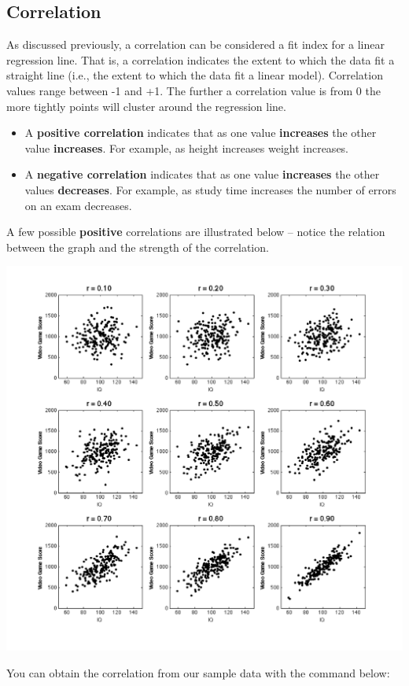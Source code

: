\documentclass[
]{krantz}
\begin{document}
\hypertarget{correlation-2}{%
\subsection{Correlation}\label{correlation-2}}

As discussed previously, a correlation can be considered a fit index for a linear regression line. That is, a correlation indicates the extent to which the data fit a straight line (i.e., the extent to which the data fit a linear model). Correlation values range between -1 and +1. The further a correlation value is from 0 the more tightly points will cluster around the regression line.

\begin{itemize}
\item
  A \textbf{positive correlation} indicates that as one value \textbf{increases} the other value \textbf{increases}. For example, as height increases weight increases.
\item
  A \textbf{negative correlation} indicates that as one value \textbf{increases} the other values \textbf{decreases}. For example, as study time increases the number of errors on an exam decreases.
\end{itemize}

A few possible \textbf{positive} correlations are illustrated below -- notice the relation between the graph and the strength of the correlation.

\includegraphics[width=0.8\linewidth,height=0.8\textheight]{ch_correlation/images/cor_mag}

You can obtain the correlation from our sample data with the command below:
\end{document}
